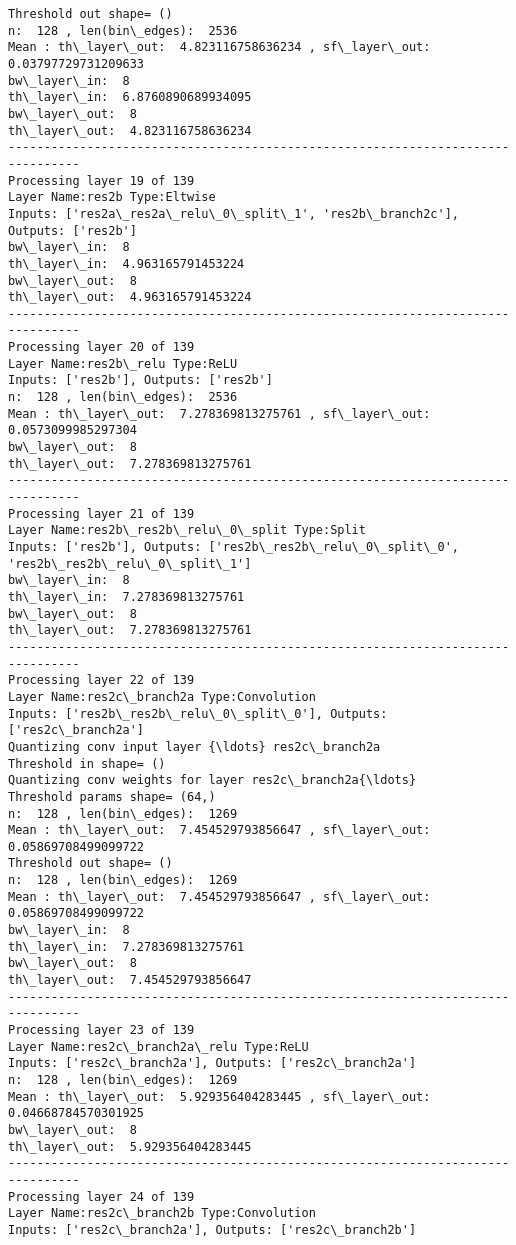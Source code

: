 \documentclass[11pt]{article}
\begin{document}
\begin{Verbatim}[commandchars=\\\{\}]
Threshold out shape= ()
n:  128 , len(bin\_edges):  2536
Mean : th\_layer\_out:  4.823116758636234 , sf\_layer\_out:  0.03797729731209633
bw\_layer\_in:  8
th\_layer\_in:  6.8760890689934095
bw\_layer\_out:  8
th\_layer\_out:  4.823116758636234
--------------------------------------------------------------------------------
Processing layer 19 of 139
Layer Name:res2b Type:Eltwise
Inputs: ['res2a\_res2a\_relu\_0\_split\_1', 'res2b\_branch2c'], Outputs: ['res2b']
bw\_layer\_in:  8
th\_layer\_in:  4.963165791453224
bw\_layer\_out:  8
th\_layer\_out:  4.963165791453224
--------------------------------------------------------------------------------
Processing layer 20 of 139
Layer Name:res2b\_relu Type:ReLU
Inputs: ['res2b'], Outputs: ['res2b']
n:  128 , len(bin\_edges):  2536
Mean : th\_layer\_out:  7.278369813275761 , sf\_layer\_out:  0.0573099985297304
bw\_layer\_out:  8
th\_layer\_out:  7.278369813275761
--------------------------------------------------------------------------------
Processing layer 21 of 139
Layer Name:res2b\_res2b\_relu\_0\_split Type:Split
Inputs: ['res2b'], Outputs: ['res2b\_res2b\_relu\_0\_split\_0', 'res2b\_res2b\_relu\_0\_split\_1']
bw\_layer\_in:  8
th\_layer\_in:  7.278369813275761
bw\_layer\_out:  8
th\_layer\_out:  7.278369813275761
--------------------------------------------------------------------------------
Processing layer 22 of 139
Layer Name:res2c\_branch2a Type:Convolution
Inputs: ['res2b\_res2b\_relu\_0\_split\_0'], Outputs: ['res2c\_branch2a']
Quantizing conv input layer {\ldots} res2c\_branch2a
Threshold in shape= ()
Quantizing conv weights for layer res2c\_branch2a{\ldots}
Threshold params shape= (64,)
n:  128 , len(bin\_edges):  1269
Mean : th\_layer\_out:  7.454529793856647 , sf\_layer\_out:  0.05869708499099722
Threshold out shape= ()
n:  128 , len(bin\_edges):  1269
Mean : th\_layer\_out:  7.454529793856647 , sf\_layer\_out:  0.05869708499099722
bw\_layer\_in:  8
th\_layer\_in:  7.278369813275761
bw\_layer\_out:  8
th\_layer\_out:  7.454529793856647
--------------------------------------------------------------------------------
Processing layer 23 of 139
Layer Name:res2c\_branch2a\_relu Type:ReLU
Inputs: ['res2c\_branch2a'], Outputs: ['res2c\_branch2a']
n:  128 , len(bin\_edges):  1269
Mean : th\_layer\_out:  5.929356404283445 , sf\_layer\_out:  0.04668784570301925
bw\_layer\_out:  8
th\_layer\_out:  5.929356404283445
--------------------------------------------------------------------------------
Processing layer 24 of 139
Layer Name:res2c\_branch2b Type:Convolution
Inputs: ['res2c\_branch2a'], Outputs: ['res2c\_branch2b']

\end{Verbatim}
\end{document}
